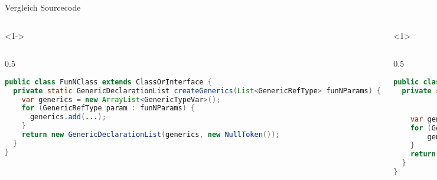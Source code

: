\documentclass{beamer}
\begin{document}
\begin{frame}[fragile]{Vergleich Sourcecode}
    \begin{columns}
        \begin{onlyenv}<1->
        \begin{column}{0.5\textwidth}
            \begin{lstlisting}[language=java]
public class FunNClass extends ClassOrInterface {
  private static GenericDeclarationList createGenerics(List<GenericRefType> funNParams) {
    var generics = new ArrayList<GenericTypeVar>();
    for (GenericRefType param : funNParams) {
      generics.add(...);
    }
    return new GenericDeclarationList(generics, new NullToken());
  }
}
            \end{lstlisting}
        \end{column}
        \end{onlyenv}
        \begin{onlyenv}<1> 
        \begin{column}{0.5\textwidth}
            \begin{lstlisting}[language=java]
public class FunNClass extends ClassOrInterface {
  private static createGenerics(funNParams) {


    var generics = new ArrayList<GenericTypeVar>();
    for (GenericRefType param : funNParams) {
        generics.add(...);
    }
    return new GenericDeclarationList(generics, new NullToken());
  }
}
            \end{lstlisting}
        \end{column}

        \end{onlyenv}
        \begin{onlyenv}<2->
        \begin{column}{0.5\textwidth}
            \begin{lstlisting}[language=java, escapechar=!]
public class FunNClass extends ClassOrInterface {
  private static GenericDeclarationList createGenerics(Iterable<? extends GenericRefType> var0) {
    List var1 = null;
    var1 = (List)(new ArrayList());
    Iterator var10000 = var0.iterator();
    while(var10000.hasNext()) {
      GenericRefType var2 = (GenericRefType)var10000.next();
      var1.add(...);
    }
    return new GenericDeclarationList(var1, new NullToken());
  }
}
            \end{lstlisting}
        \end{column}
        \end{onlyenv}
    \end{columns}
\end{frame}
\end{document}
